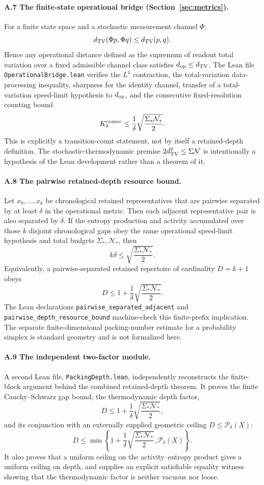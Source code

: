 \paragraph{A.7 The finite-state operational bridge (Section~\ref{sec:metrics}).}
For a finite state space and a stochastic measurement channel $\Phi$,
\[
d_{\rm TV}(\Phi p,\Phi q)\le d_{\rm TV}(p,q).
\]
Hence any operational distance defined as the supremum of readout total
variation over a fixed admissible channel class satisfies
$d_{\rm op}\le d_{\rm TV}$. The Lean file
\nolinkurl{OperationalBridge.lean} verifies the $L^1$ contraction,
the total-variation data-processing inequality, sharpness for the identity
channel, transfer of a total-variation speed-limit hypothesis to
$d_{\rm op}$, and the consecutive fixed-resolution counting bound
\[
K_\delta^{\rm consec}
\le
\frac1\delta\sqrt{\frac{\Sigma_*\mathcal N_*}{2}}.
\]
This is explicitly a transition-count statement, not by itself a retained-depth
definition. The stochastic-thermodynamic premise
$2d_{\rm TV}^2\le\Sigma\mathcal N$ is intentionally a hypothesis of the
Lean development rather than a theorem of it.

\paragraph{A.8 The pairwise retained-depth resource bound.}
Let $x_0,\ldots,x_k$ be chronological retained representatives that are
pairwise separated by at least $\delta$ in the operational metric. Then each
adjacent representative pair is also separated by $\delta$. If the entropy
production and activity accumulated over those $k$ disjoint chronological gaps
obey the same operational speed-limit hypothesis and total budgets
$\Sigma_*,\mathcal N_*$, then
\[
k\delta
\le
\sqrt{\frac{\Sigma_*\mathcal N_*}{2}}.
\]
Equivalently, a pairwise-separated retained repertoire of cardinality
$D=k+1$ obeys
\[
D
\le
1+\frac1\delta\sqrt{\frac{\Sigma_*\mathcal N_*}{2}}.
\]
The Lean declarations
\texttt{pairwise\_separated\_adjacent} and
\texttt{pairwise\_depth\_resource\_bound} machine-check this finite-prefix
implication. The separate finite-dimensional packing-number estimate for a
probability simplex is standard geometry and is not formalized here.

\paragraph{A.9 The independent two-factor module.}
A second Lean file, \nolinkurl{PackingDepth.lean}, independently reconstructs
the finite-block argument behind the combined retained-depth theorem. It proves
the finite Cauchy--Schwarz gap bound, the thermodynamic depth factor,
\[
D
\le
1+\frac1\delta\sqrt{\frac{\Sigma_*\mathcal N_*}{2}},
\]
and its conjunction with an externally supplied geometric ceiling
$D\le\mathcal P_\delta(X)$:
\[
D
\le
\min\left\{
1+\frac1\delta\sqrt{\frac{\Sigma_*\mathcal N_*}{2}},
\mathcal P_\delta(X)
\right\}.
\]
It also proves that a uniform ceiling on the activity--entropy product gives a
uniform ceiling on depth, and supplies an explicit satisfiable equality witness
showing that the thermodynamic factor is neither vacuous nor loose.

